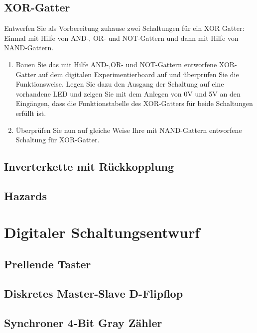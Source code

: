 \documentclass[paper=a4, fontsize=11pt]{scrartcl}
\numberwithin{equation}{section}
\numberwithin{figure}{section}
\numberwithin{table}{section}
\begin{document}
\subsection{XOR-Gatter}

Entwerfen Sie als Vorbereitung zuhause zwei Schaltungen für ein XOR Gatter: Einmal mit Hilfe von AND-, OR- und NOT-Gattern und dann mit Hilfe von NAND-Gattern. \\

\begin{enumerate}
\item Bauen Sie das mit Hilfe AND-,OR- und NOT-Gattern entworfene XOR-Gatter auf dem digitalen Experimentierboard auf und überprüfen Sie die Funktionsweise. Legen Sie dazu den Ausgang der Schaltung auf eine vorhandene LED und zeigen Sie mit dem Anlegen von 0V und 5V an den Eingängen, dass die Funktionstabelle des XOR-Gatters für beide Schaltungen erfüllt ist. 
\item Überprüfen Sie nun auf gleiche Weise Ihre mit NAND-Gattern entworfene Schaltung für XOR-Gatter.
\end{enumerate}

\subsection{Inverterkette mit Rückkopplung}

\subsection{Hazards}


\newpage

\section{Digitaler Schaltungsentwurf}

\subsection{Prellende Taster}

\subsection{Diskretes Master-Slave D-Flipflop}

\subsection{Synchroner 4-Bit Gray Zähler}
\end{document}
